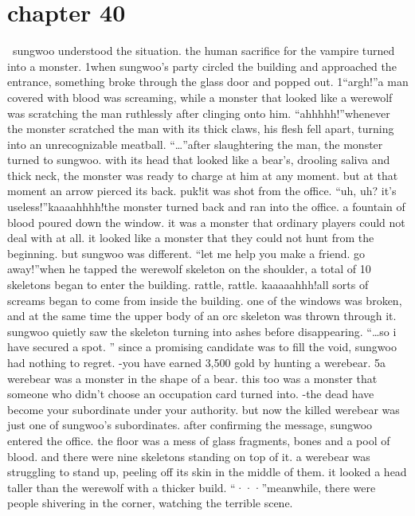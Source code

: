 \section{chapter 40}






 sungwoo understood the situation.
 the human sacrifice for the vampire turned into a monster.
1when sungwoo’s party circled the building and approached the entrance, something broke through the glass door and popped out.
1“argh!”a man covered with blood was screaming, while a monster that looked like a werewolf was scratching the man ruthlessly after clinging onto him.
“ahhhhh!”whenever the monster scratched the man with its thick claws, his flesh fell apart, turning into an unrecognizable meatball.
“…”after slaughtering the man, the monster turned to sungwoo.
 with its head that looked like a bear’s, drooling saliva and thick neck, the monster was ready to charge at him at any moment.
 but at that moment an arrow pierced its back.
puk!it was shot from the office.
“uh, uh? it’s useless!”kaaaahhhh!the monster turned back and ran into the office.
 a fountain of blood poured down the window.
 it was a monster that ordinary players could not deal with at all.
 it looked like a monster that they could not hunt from the beginning.
but sungwoo was different.
“let me help you make a friend.
 go away!”when he tapped the werewolf skeleton on the shoulder, a total of 10 skeletons began to enter the building.
rattle, rattle.
kaaaaahhh!all sorts of screams began to come from inside the building.
one of the windows was broken, and at the same time the upper body of an orc skeleton was thrown through it.
 sungwoo quietly saw the skeleton turning into ashes before disappearing.
“…so i have secured a spot.
”
since a promising candidate was to fill the void, sungwoo had nothing to regret.
-you have earned 3,500 gold by hunting a werebear.
5a werebear was a monster in the shape of a bear.
 this too was a monster that someone who didn’t choose an occupation card turned into.
-the dead have become your subordinate under your authority.
but now the killed werebear was just one of sungwoo’s subordinates.
after confirming the message, sungwoo entered the office.
the floor was a mess of glass fragments, bones and a pool of blood.
 and there were nine skeletons standing on top of it.
 a werebear was struggling to stand up, peeling off its skin in the middle of them.
 it looked a head taller than the werewolf with a thicker build.
“···”meanwhile, there were people shivering in the corner, watching the terrible scene.

